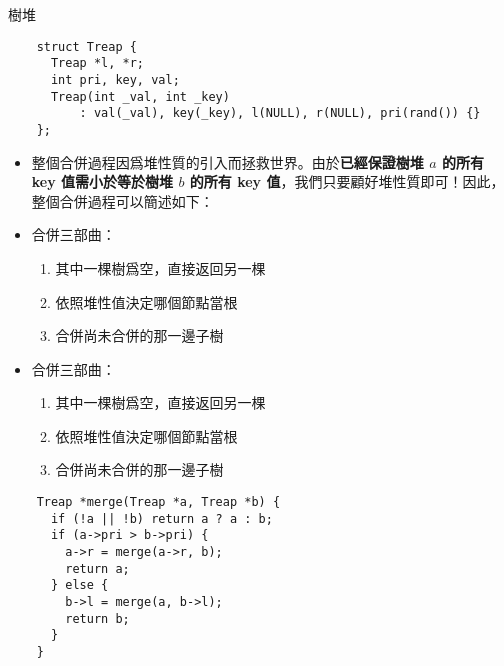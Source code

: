 \documentclass[standalone]{beamer}
\begin{document}
\begin{frame}[fragile]{樹堆}
  \begin{verbatim}
    struct Treap {
      Treap *l, *r;
      int pri, key, val;
      Treap(int _val, int _key)
          : val(_val), key(_key), l(NULL), r(NULL), pri(rand()) {}
    };
  \end{verbatim}
\end{frame}

\begin{frame}[fragile]{}
  \begin{itemize}
    \item 整個合併過程因爲堆性質的引入而拯救世界。由於\textbf{已經保證樹堆 $a$ 的所有 key 值需小於等於樹堆 $b$ 的所有 key 值}，我們只要顧好堆性質即可！因此，整個合併過程可以簡述如下：
    \item 
      合併三部曲：
      \begin{enumerate}
        \item 其中一棵樹爲空，直接返回另一棵
        \item 依照堆性值決定哪個節點當根
        \item 合併尚未合併的那一邊子樹
      \end{enumerate}
  \end{itemize}
\end{frame}

\begin{frame}[fragile]{}
  \begin{itemize}
    \item 
      合併三部曲：
      \begin{enumerate}
        \item 其中一棵樹爲空，直接返回另一棵
        \item 依照堆性值決定哪個節點當根
        \item 合併尚未合併的那一邊子樹
      \end{enumerate}
  \end{itemize}
\end{frame}

\begin{frame}[fragile]{}
  \begin{verbatim}
    Treap *merge(Treap *a, Treap *b) {
      if (!a || !b) return a ? a : b;
      if (a->pri > b->pri) {
        a->r = merge(a->r, b);
        return a;
      } else {
        b->l = merge(a, b->l);
        return b;
      }
    }
  \end{verbatim}
\end{frame}
\end{document}
